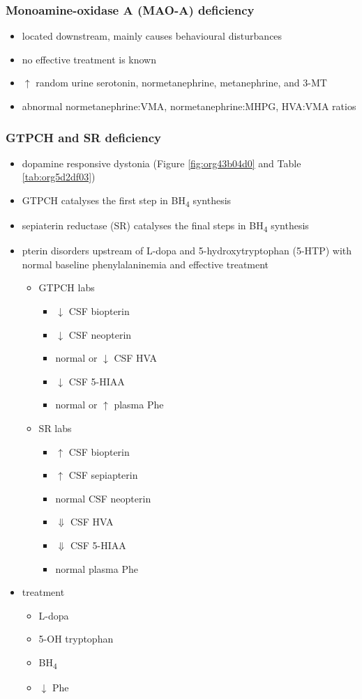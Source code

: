 \documentclass{scrartcl}
\begin{document}
\subsubsection{Monoamine-oxidase A (MAO-A) deficiency}
\label{sec:org2b54f04}
\begin{itemize}
\item located downstream, mainly causes behavioural disturbances
\item no effective treatment is known
\item \(\uparrow\) random urine serotonin, normetanephrine, metanephrine, and 3-MT
\item abnormal normetanephrine:VMA, normetanephrine:MHPG, HVA:VMA ratios
\end{itemize}
\subsubsection{GTPCH and SR deficiency}
\label{sec:org6578af0}
\begin{itemize}
\item dopamine responsive dystonia (Figure \ref{fig:org43b04d0} and Table \ref{tab:org5d2df03})
\item GTPCH catalyses the first step in BH\textsubscript{4} synthesis
\item sepiaterin reductase (SR) catalyses the final steps in BH\textsubscript{4} synthesis
\item pterin disorders upstream of L-dopa and 5-hydroxytryptophan
(5-HTP) with normal baseline phenylalaninemia and effective
treatment
\begin{itemize}
\item GTPCH labs
\begin{itemize}
\item \(\downarrow\) CSF biopterin
\item \(\downarrow\) CSF neopterin
\item normal or \(\downarrow\) CSF HVA
\item \(\downarrow\) CSF 5-HIAA
\item normal or \(\uparrow\) plasma Phe
\end{itemize}
\item SR labs
\begin{itemize}
\item \(\uparrow\) CSF biopterin
\item \(\uparrow\) CSF sepiapterin
\item normal CSF neopterin
\item \(\Downarrow\) CSF HVA
\item \(\Downarrow\) CSF 5-HIAA
\item normal plasma Phe
\end{itemize}
\end{itemize}
\item treatment
\begin{itemize}
\item L-dopa
\item 5-OH tryptophan
\item BH\textsubscript{4}
\item \(\downarrow\) Phe
\end{itemize}
\end{itemize}
\end{document}
